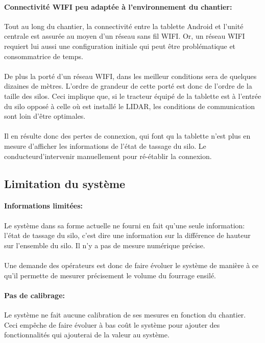 \documentclass[12pt,a4paper]{report}
\begin{document}
\paragraph{Connectivité WIFI peu adaptée à l'environnement du chantier: } Tout au long du chantier, la connectivité entre la tablette Android et l'unité centrale est assurée au moyen d'un réseau sans fil WIFI. Or, un réseau WIFI requiert lui aussi une configuration initiale qui peut être problématique et consommatrice de temps.

\paragraph{} De plus la porté d'un réseau WIFI, dans les meilleur conditions sera de quelques dizaines de mètres. L'ordre de grandeur de cette porté est donc de l'ordre de la taille des silos. Ceci implique que, si le tracteur équipé de la tablette est à l'entrée du silo opposé à celle où est installé le LIDAR, les conditions de communication sont loin d'être optimales.

\paragraph{} Il en résulte donc des pertes de connexion, qui font qu la tablette n'est plus en mesure d'afficher les informations de l'état de tassage du silo. Le conducteurd'intervenir manuellement pour ré-établir la connexion. 


\subsection{Limitation du système}
\paragraph{Informations limitées:} Le système dans sa forme actuelle ne fourni en fait qu'une seule information: l'état de tassage du silo, c'est dire une information sur la différence de hauteur sur l'ensemble du silo. Il n'y a pas de mesure numérique précise.

\paragraph{} Une demande des opérateurs est donc de faire évoluer le système de manière à ce qu'il permette de mesurer précisement le volume du fourrage ensilé.

\paragraph{Pas de calibrage:} Le système ne fait aucune calibration de ses mesures en fonction du chantier. Ceci empêche de faire évoluer à bas coût le système pour ajouter des fonctionnalités qui ajouterai de la valeur au système.
\end{document}
